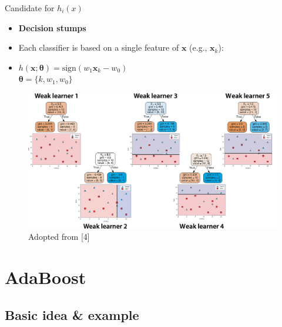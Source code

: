 \documentclass[serif, aspectratio=169]{beamer}
\begin{document}
\begin{frame}{Candidate for $h_i(x)$}
    \begin{itemize}
        \itemsep1em
        \justifying
        \item \textbf{Decision stumps}
        \item Each classifier is based on a single feature of $\boldsymbol{x}$ (e.g., $\boldsymbol{x}_k$):
        \item[] \begin{center}
            $h(\boldsymbol{x};\boldsymbol{\theta})=\text{sign}(w_1\boldsymbol{x}_k-w_0)$ \\ \medskip
            $\boldsymbol{\theta}=\{k,w_1,w_0\}$
        \end{center} 
    \end{itemize}
    \endminipage
    \hfill
    \begin{figure}[!htb]
        \includegraphics[width=\linewidth]{pic/decisionstumps.png}
        {\scriptsize Adopted from [4]}
    \end{figure}
    \endminipage
\end{frame}

\section{AdaBoost}

\subsection{Basic idea \& example}
\end{document}
